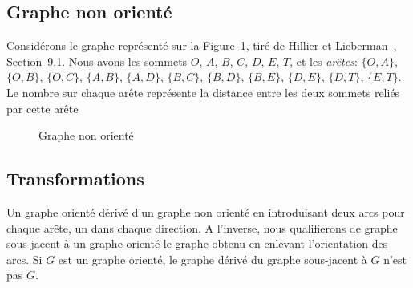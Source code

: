 \subsection{Graphe non orienté}

\begin{example}
\label{ex:parc_seervada}

Considérons le graphe représenté sur la Figure~\ref{fig:undirected graph}, tiré de Hillier et Lieberman~\cite{HillLieb01}, Section~9.1.
Nous avons les sommets $O$, $A$, $B$, $C$, $D$, $E$, $T$, et les {\sl arêtes}: $\lbrace O,A \rbrace$, $\lbrace O,B \rbrace$, $\lbrace O,C \rbrace$, $\lbrace A,B \rbrace$, $\lbrace A,D \rbrace$, $\lbrace B,C \rbrace$,
$\lbrace B,D \rbrace$, $\lbrace B,E \rbrace$, $\lbrace D,E \rbrace$, $\lbrace D,T \rbrace$, $\lbrace E,T \rbrace$.
Le nombre sur chaque arête représente la distance entre les deux sommets reliés par cette arête
\begin{figure}[htbp]
\begin{center}
\caption{Graphe non orienté}
\label{fig:undirected graph}
\end{center}

\end{figure}
 
\end{example}

\subsection{Transformations}

Un graphe orienté dérivé d'un graphe non orienté en introduisant deux arcs pour chaque arête, un dans chaque direction.
A l'inverse, nous qualifierons de graphe sous-jacent à un graphe orienté le graphe obtenu en enlevant l'orientation des arcs.
Si $G$ est un graphe orienté, le graphe dérivé du graphe sous-jacent à $G$ n'est pas $G$.

